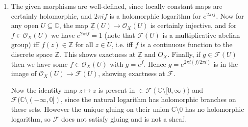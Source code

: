 \documentclass{report}
\newcommand{\shConst}[1]{\underline{#1}} %
\renewcommand{\O}{\mathscr{O}} %
\newcommand{\scrF}{\mathscr{F}}
\newcommand{\Z}{\mathbb{Z}}
\newcommand{\C}{\mathbb{C}}
\begin{document}
\begin{enumerate}[label=\textbf{2.3.\Alph*.}]
	\item The given morphisms are well-defined, since locally constant maps
	      are certainly holomorphic, and $2\pi if$ is a holomorphic logarithm
	      for $e^{2\pi if}$. Now for any open $U\subseteq\C$, the map
	      $\shConst\Z(U)\to\O_X(U)$ is certainly injective, and for
	      $f\in\O_X(U)$ we have $e^{2\pi if}=1$ (note that $\scrF(U)$ is a
	      multiplicative abelian group) iff $f(z)\in\Z$ for all $z\in U$, i.e.
	      iff $f$ is a continuous function to the discrete space $\Z$. This
	      shows exactness at $\shConst\Z$ and $O_X$. Finally, if $g\in\scrF(U)$
	      then we have some $f\in\O_X(U)$ with $g=e^f$. Hence
	      $g=e^{2\pi i(f/2\pi i)}$ is in the image of $\O_X(U)\to\scrF(U)$,
	      showing exactness at $\scrF$.

	      Now the identity map $z\mapsto z$ is present in
	      $\in\scrF(\C\setminus[0,\infty))$ and $\scrF(\C\setminus(-\infty,0])$,
	      since the natural logarithm has holomorphic branches on these sets.
	      However the unique gluing on their union $\C\setminus0$ has no
	      holomorphic logarithm, so $\scrF$ does not satisfy gluing and is not a
	      sheaf.
\end{enumerate}
\end{document}
